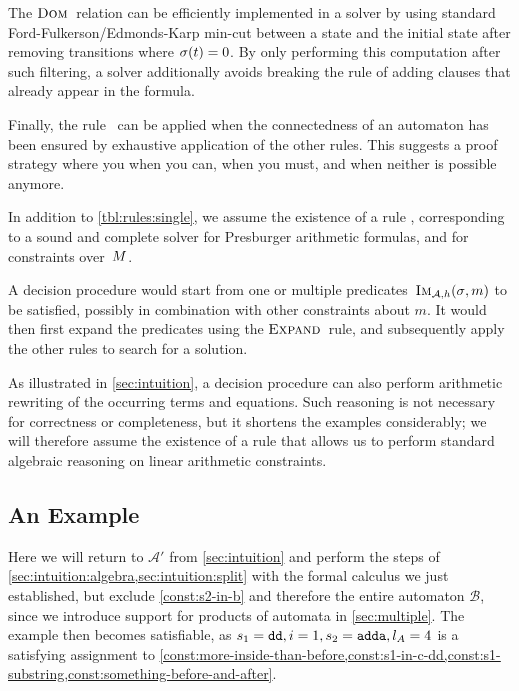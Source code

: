 The $\operatorname{\textsc{Dom}}$~relation can be efficiently implemented in a solver
by using standard Ford-Fulkerson\slash{}Edmonds-Karp min-cut between a state
and the initial state after removing transitions where $\operatorname{\sigma}(t) = 0$.
By only performing this computation after such filtering, a solver additionally avoids
breaking the rule of adding clauses that already appear in the formula.

Finally, the rule~\Subsume{} can be applied when the connectedness of
an automaton has been ensured by exhaustive application of the other
rules. This suggests a proof strategy where you \Propagate{} when you
can, \Split{} when you must, and \Subsume{} when neither is possible
anymore.

In addition to \cref{tbl:rules:single}, we assume the existence of a rule
\PresburgerClose{}, corresponding to a sound and complete solver for Presburger
arithmetic formulas, and for constraints over~$M$.

A decision procedure would start from one or multiple
predicates~$\operatorname{\textsc{Im}}_{\mathcal{A}, h}(\operatorname{\sigma}, m)$ to be satisfied, possibly in
combination with other constraints about $m$. It would then first
expand the predicates using the $\textsc{Expand}{}$~rule, and subsequently
apply the other rules to search for a solution.

As illustrated in \cref{sec:intuition}, a decision procedure can
also perform arithmetic rewriting of the occurring terms and
equations. Such reasoning is not necessary for correctness or
completeness, but it shortens the examples considerably; we
will therefore assume the existence of a
rule \EquationReasoning{} that allows us to perform standard algebraic reasoning
on linear arithmetic constraints. 


\subsection{An Example}\label{sec:single:example}
Here we will return to $\mathcal{A}'$ from \cref{sec:intuition} and perform the steps of
\cref{sec:intuition:algebra,sec:intuition:split} with the
formal calculus we just established, but exclude \cref{const:s2-in-b} and
therefore the entire automaton $\mathcal{B}$, since we introduce support for products of
automata in \cref{sec:multiple}. The example then becomes
satisfiable, as $s_1 = \texttt{dd}, i = 1, s_2 = \texttt{adda}, l_A = 4$ is a
satisfying assignment to
\cref{const:more-inside-than-before,const:s1-in-c-dd,const:s1-substring,const:something-before-and-after}.

